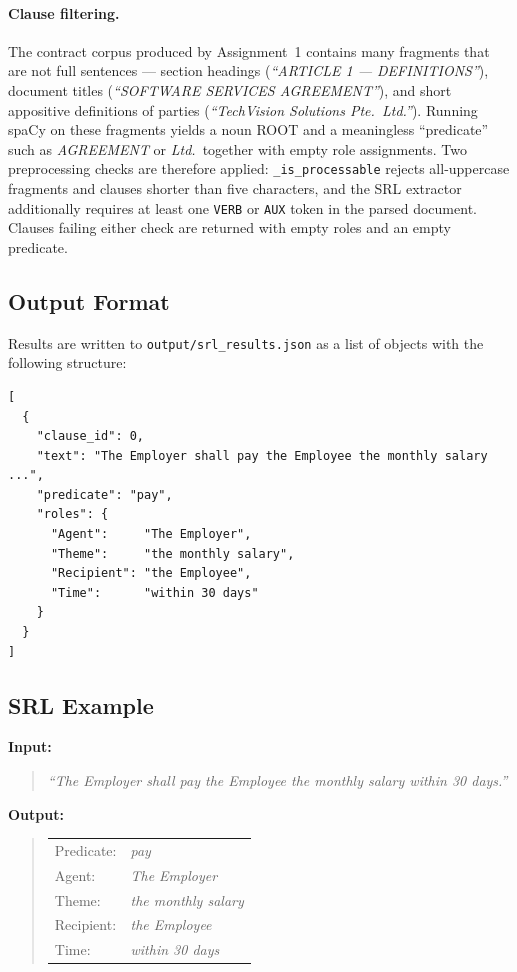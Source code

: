 \documentclass[assignment.tex]{subfiles}
\begin{document}
\paragraph{Clause filtering.}
The contract corpus produced by Assignment~1 contains many fragments that are
not full sentences — section headings (\textit{``ARTICLE 1 — DEFINITIONS''}),
document titles (\textit{``SOFTWARE SERVICES AGREEMENT''}), and short
appositive definitions of parties (\textit{``TechVision Solutions Pte.\ Ltd.''}).
Running spaCy on these fragments yields a noun ROOT and a meaningless
``predicate'' such as \textit{AGREEMENT} or \textit{Ltd.}\ together with
empty role assignments.  Two preprocessing checks are therefore applied:
\texttt{\_is\_processable} rejects all-uppercase fragments and clauses shorter
than five characters, and the SRL extractor additionally requires at least one
\texttt{VERB} or \texttt{AUX} token in the parsed document.  Clauses failing
either check are returned with empty roles and an empty predicate.

\subsection{Output Format}

Results are written to \texttt{output/srl\_results.json} as a list of objects with
the following structure:

\begin{lstlisting}[style=jsonStyle,
                   caption={SRL output format.},
                   label={lst:srl-json}]
[
  {
    "clause_id": 0,
    "text": "The Employer shall pay the Employee the monthly salary ...",
    "predicate": "pay",
    "roles": {
      "Agent":     "The Employer",
      "Theme":     "the monthly salary",
      "Recipient": "the Employee",
      "Time":      "within 30 days"
    }
  }
]
\end{lstlisting}

\subsection{SRL Example}

\noindent\textbf{Input:}
\begin{quote}
    \textit{``The Employer shall pay the Employee the monthly salary within 30 days.''}
\end{quote}

\noindent\textbf{Output:}
\begin{quote}
\begin{tabular}{@{}ll@{}}
    Predicate: & \textit{pay} \\
    Agent:     & \textit{The Employer} \\
    Theme:     & \textit{the monthly salary} \\
    Recipient: & \textit{the Employee} \\
    Time:      & \textit{within 30 days} \\
\end{tabular}
\end{quote}
\end{document}
